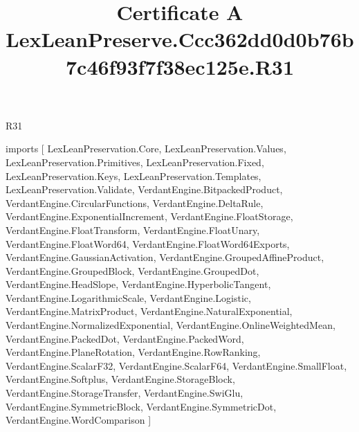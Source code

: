 \begin{lexlean}{R31}
\title{Certificate A LexLeanPreserve.Ccc362dd0d0b76b7c46f93f7f38ec125e.R31}
\begin{coremodule}
imports [
  LexLeanPreservation.Core,
  LexLeanPreservation.Values,
  LexLeanPreservation.Primitives,
  LexLeanPreservation.Fixed,
  LexLeanPreservation.Keys,
  LexLeanPreservation.Templates,
  LexLeanPreservation.Validate,
  VerdantEngine.BitpackedProduct,
  VerdantEngine.CircularFunctions,
  VerdantEngine.DeltaRule,
  VerdantEngine.ExponentialIncrement,
  VerdantEngine.FloatStorage,
  VerdantEngine.FloatTransform,
  VerdantEngine.FloatUnary,
  VerdantEngine.FloatWord64,
  VerdantEngine.FloatWord64Exports,
  VerdantEngine.GaussianActivation,
  VerdantEngine.GroupedAffineProduct,
  VerdantEngine.GroupedBlock,
  VerdantEngine.GroupedDot,
  VerdantEngine.HeadSlope,
  VerdantEngine.HyperbolicTangent,
  VerdantEngine.LogarithmicScale,
  VerdantEngine.Logistic,
  VerdantEngine.MatrixProduct,
  VerdantEngine.NaturalExponential,
  VerdantEngine.NormalizedExponential,
  VerdantEngine.OnlineWeightedMean,
  VerdantEngine.PackedDot,
  VerdantEngine.PackedWord,
  VerdantEngine.PlaneRotation,
  VerdantEngine.RowRanking,
  VerdantEngine.ScalarF32,
  VerdantEngine.ScalarF64,
  VerdantEngine.SmallFloat,
  VerdantEngine.Softplus,
  VerdantEngine.StorageBlock,
  VerdantEngine.StorageTransfer,
  VerdantEngine.SwiGlu,
  VerdantEngine.SymmetricBlock,
  VerdantEngine.SymmetricDot,
  VerdantEngine.WordComparison
]


\end{coremodule}
\end{lexlean}
